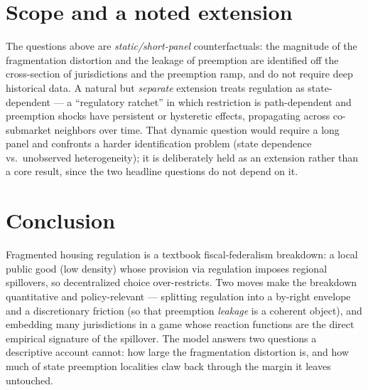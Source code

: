 \documentclass[11pt]{article}
\begin{document}
\section{Scope and a noted extension}\label{sec:scope}

The questions above are \emph{static/short-panel} counterfactuals: the magnitude of the
fragmentation distortion and the leakage of preemption are identified off the cross-section of
jurisdictions and the preemption ramp, and do not require deep historical data. A natural but
\emph{separate} extension treats regulation as state-dependent --- a ``regulatory ratchet'' in
which restriction is path-dependent and preemption shocks have persistent or hysteretic effects,
propagating across co-submarket neighbors over time. That dynamic question would require a long
panel and confronts a harder identification problem (state dependence vs.\ unobserved
heterogeneity); it is deliberately held as an extension rather than a core result, since the two
headline questions do not depend on it.

\section{Conclusion}

Fragmented housing regulation is a textbook fiscal-federalism breakdown: a local public good
(low density) whose provision via regulation imposes regional spillovers, so decentralized
choice over-restricts. Two moves make the breakdown quantitative and policy-relevant ---
splitting regulation into a by-right envelope and a discretionary friction (so that preemption
\emph{leakage} is a coherent object), and embedding many jurisdictions in a game whose
reaction functions are the direct empirical signature of the spillover. The model answers two
questions a descriptive account cannot: how large the fragmentation distortion is, and how much
of state preemption localities claw back through the margin it leaves untouched.



\end{document}
